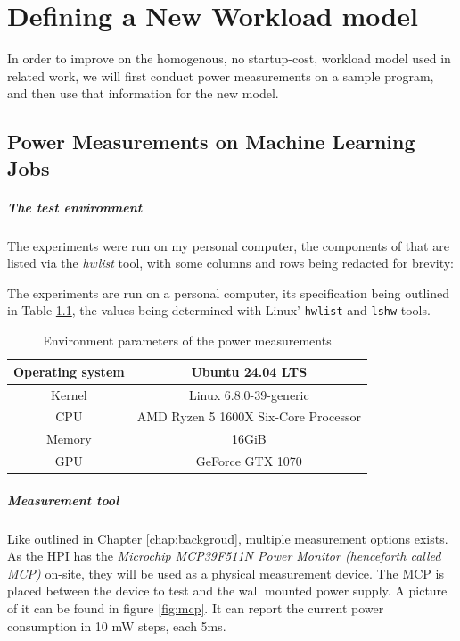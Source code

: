 \chapter{Defining a New Workload model}

In order to improve on the homogenous, no startup-cost, workload model used in related work, we will first conduct power measurements on a sample program, and then use that information for the new model.

\section{Power Measurements on Machine Learning Jobs}
\label{sec:power_measurements}

\paragraph{The test environment}

The experiments were run on my personal computer, the components of that are listed via the \emph{hwlist} tool, with some columns and rows being redacted for brevity:

The experiments are run on a personal computer, its specification being outlined in Table \ref{tab:measurement_environment}, the values being determined with Linux' \verb|hwlist| and \verb|lshw| tools.

\begin{table}[h!]
    \centering
    \begin{tabular}{|c|c|}
    \hline
        Operating system & Ubuntu 24.04 LTS \\ \hline
        Kernel & Linux 6.8.0-39-generic \\ \hline
        CPU & AMD Ryzen 5 1600X Six-Core Processor \\ \hline
        Memory & 16GiB \\ \hline
        GPU & GeForce GTX 1070 \\ \hline
    \end{tabular}
    \caption{Environment parameters of the power measurements}
\label{tab:measurement_environment}
\end{table}

\paragraph{Measurement tool}

Like outlined in Chapter \ref{chap:backgroud}, multiple measurement options exists. 
As the HPI has the \emph{Microchip MCP39F511N Power Monitor (henceforth called MCP)} on-site, they will be used as a physical measurement device.
The MCP is placed between the device to test and the wall mounted power supply. A picture of it can be found in figure \ref{fig:mcp}. It can report the current power consumption in 10 mW steps, each 5ms.

